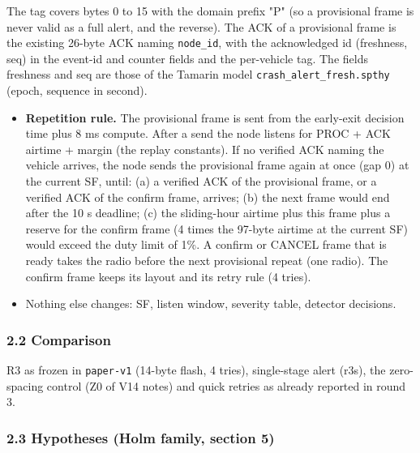 The tag covers bytes 0 to 15 with the domain prefix "P" (so a provisional frame is never valid as a full alert, and the reverse). The ACK of a provisional frame is the existing 26-byte ACK naming \texttt{node\_id}, with the acknowledged id (freshness, seq) in the event-id and counter fields and the per-vehicle tag. The fields freshness and seq are those of the Tamarin model \texttt{crash\_alert\_fresh.spthy} (epoch, sequence in second).

\begin{itemize}
\item \textbf{Repetition rule.} The provisional frame is sent from the early-exit decision time plus 8 ms compute. After a send the node listens for PROC + ACK airtime + margin (the replay constants). If no verified ACK naming the vehicle arrives, the node sends the provisional frame again at once (gap 0) at the current SF, until: (a) a verified ACK of the provisional frame, or a verified ACK of the confirm frame, arrives; (b) the next frame would end after the 10 s deadline; (c) the sliding-hour airtime plus this frame plus a reserve for the confirm frame (4 times the 97-byte airtime at the current SF) would exceed the duty limit of 1\%. A confirm or CANCEL frame that is ready takes the radio before the next provisional repeat (one radio). The confirm frame keeps its layout and its retry rule (4 tries).
\item Nothing else changes: SF, listen window, severity table, detector decisions.
\end{itemize}

\subsubsection*{2.2 Comparison}

R3 as frozen in \texttt{paper-v1} (14-byte flash, 4 tries), single-stage alert (r3s), the zero-spacing control (Z0 of V14 notes) and quick retries as already reported in round 3.

\subsubsection*{2.3 Hypotheses (Holm family, section 5)}

